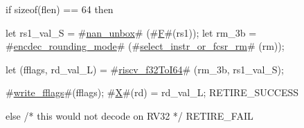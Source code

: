 if   sizeof(flen) == 64
then {
  let rs1_val_S = #\hyperref[sailRISCVznanzyunbox]{nan\_unbox}# (#\hyperref[sailRISCVzF]{F}#(rs1));
  let rm_3b     = #\hyperref[sailRISCVzencdeczyroundingzymode]{encdec\_rounding\_mode}# (#\hyperref[sailRISCVzselectzyinstrzyorzyfcsrzyrm]{select\_instr\_or\_fcsr\_rm}#  (rm));

  let (fflags, rd_val_L) = #\hyperref[sailRISCVzriscvzyf32ToI64]{riscv\_f32ToI64}# (rm_3b, rs1_val_S);

  #\hyperref[sailRISCVzwritezyfflags]{write\_fflags}#(fflags);
  #\hyperref[sailRISCVzX]{X}#(rd) = rd_val_L;
  RETIRE_SUCCESS
} else {
  /* this would not decode on RV32 */
  RETIRE_FAIL
}
